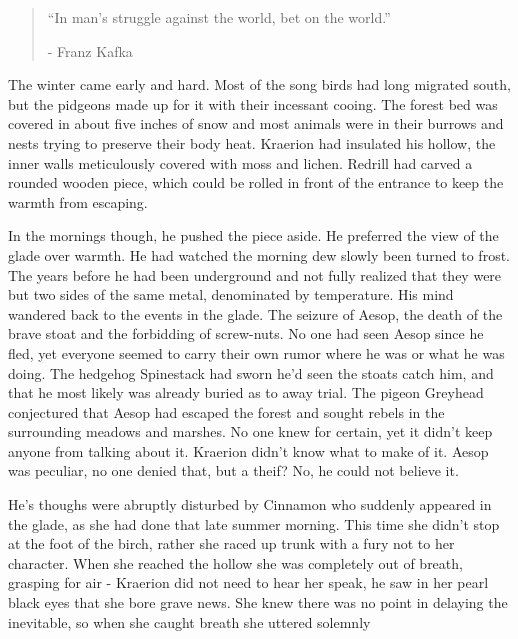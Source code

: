 \documentclass[smalldemyvopaper,11pt,twoside,onecolumn,openright,extrafontsizes]{memoir}
\begin{document}
\vspace{-1.3cm}
\begin{localsize}{10}
	\begin{quote}
		“In man's struggle against the world, bet on the world.”
		\begin{flushright}- Franz Kafka \end{flushright}
	\end{quote} 
\end{localsize}
\vspace{1cm}

The winter came early and hard. Most of the song birds had long migrated south, but the pidgeons made up for it with their incessant cooing. The forest bed was covered in about five inches of snow and most animals were in their burrows and nests trying to preserve their body heat. Kraerion had insulated his hollow, the inner walls meticulously covered with moss and lichen. Redrill had carved a rounded wooden piece, which could be rolled in front of the entrance to keep the warmth from escaping.

In the mornings though, he pushed the piece aside. He preferred the view of the glade over warmth. He had watched the morning dew slowly been turned to frost. The years before he had been underground and not fully realized that they were but two sides of the same metal, denominated by temperature. His mind wandered back to the events in the glade. The seizure of Aesop, the death of the brave stoat and the forbidding of screw-nuts. No one had seen Aesop since he fled, yet everyone seemed to carry their own rumor where he was or what he was doing. The hedgehog Spinestack had sworn he'd seen the stoats catch him, and that he most likely was already buried as to away trial. The pigeon Greyhead conjectured that Aesop had escaped the forest and sought rebels in the surrounding meadows and marshes. No one knew for certain, yet it didn't keep anyone from talking about it. Kraerion didn't know what to make of it. Aesop was peculiar, no one denied that, but a theif? No, he could not believe it.

He's thoughs were abruptly disturbed by Cinnamon who suddenly appeared in the glade, as she had done that late summer morning. This time she didn't stop at the foot of the birch, rather she raced up trunk with a fury not to her character. When she reached the hollow she was completely out of breath, grasping for air - Kraerion did not need to hear her speak, he saw in her pearl black eyes that she bore grave news. She knew there was no point in delaying the inevitable, so when she caught breath she uttered solemnly 
\end{document}

